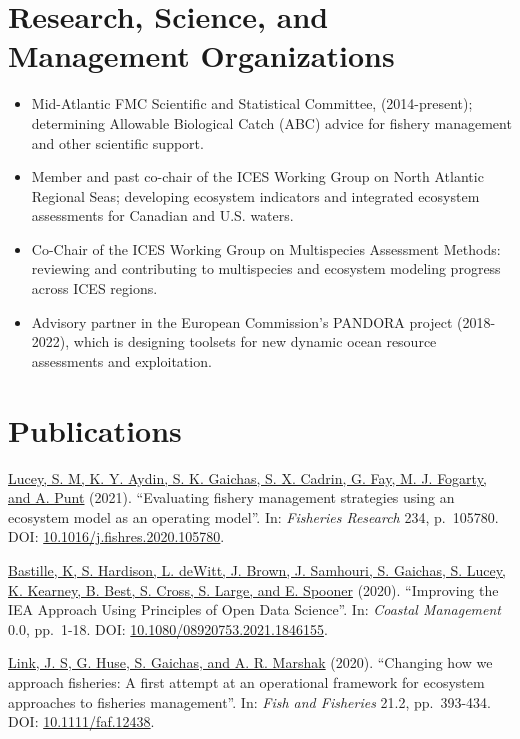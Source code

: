 \documentclass[11pt, a4paper]{awesome-cv}
\providecommand{\tightlist}{%
	\setlength{\itemsep}{0pt}\setlength{\parskip}{0pt}}
\begin{document}
\hypertarget{research-science-and-management-organizations}{%
\section{Research, Science, and Management Organizations}\label{research-science-and-management-organizations}}

\begin{itemize}
\tightlist
\item
  Mid-Atlantic FMC Scientific and Statistical Committee, (2014-present); determining Allowable Biological Catch (ABC) advice for fishery management and other scientific support.
\item
  Member and past co-chair of the ICES Working Group on North Atlantic Regional Seas; developing ecosystem indicators and integrated ecosystem assessments for Canadian and U.S. waters.
\item
  Co-Chair of the ICES Working Group on Multispecies Assessment Methods: reviewing and contributing to multispecies and ecosystem modeling progress across ICES regions.
\item
  Advisory partner in the European Commission's PANDORA project (2018-2022), which is designing toolsets for new dynamic ocean resource assessments and exploitation.
\end{itemize}

\hypertarget{publications}{%
\section{Publications}\label{publications}}

\protect\hyperlink{cite-lucey_evaluating_2021}{Lucey, S. M, K. Y. Aydin, S. K.
Gaichas, S. X. Cadrin, G. Fay, M. J. Fogarty, and A.
Punt} (2021). ``Evaluating fishery
management strategies using an ecosystem model as an operating model''.
In: \emph{Fisheries Research} 234, p.~105780. DOI:
\href{https://doi.org/10.1016\%2Fj.fishres.2020.105780}{10.1016/j.fishres.2020.105780}.

\protect\hyperlink{cite-bastille_improving_2020}{Bastille, K, S. Hardison, L.
deWitt, J. Brown, J. Samhouri, S. Gaichas, S. Lucey, K. Kearney, B.
Best, S. Cross, S. Large, and E.
Spooner} (2020). ``Improving the IEA
Approach Using Principles of Open Data Science''. In: \emph{Coastal
Management} 0.0, pp.~1-18. DOI:
\href{https://doi.org/10.1080\%2F08920753.2021.1846155}{10.1080/08920753.2021.1846155}.

\protect\hyperlink{cite-link_changing_2020}{Link, J. S, G. Huse, S. Gaichas,
and A. R. Marshak} (2020). ``Changing how we
approach fisheries: A first attempt at an operational framework for
ecosystem approaches to fisheries management''. In: \emph{Fish and Fisheries}
21.2, pp.~393-434. DOI:
\href{https://doi.org/10.1111\%2Ffaf.12438}{10.1111/faf.12438}.
\end{document}
